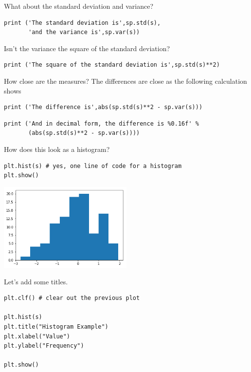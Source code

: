 What about the standard deviation and variance?

\begin{verbatim}
print ('The standard deviation is',sp.std(s),
       'and the variance is',sp.var(s))
\end{verbatim}

Isn't the variance the square of the standard deviation?

\begin{verbatim}
print ('The square of the standard deviation is',sp.std(s)**2)
\end{verbatim}

How close are the measures? The differences are close as the following
calculation shows

\begin{verbatim}
print ('The difference is',abs(sp.std(s)**2 - sp.var(s)))
\end{verbatim}

\begin{verbatim}
print ('And in decimal form, the difference is %0.16f' % 
       (abs(sp.std(s)**2 - sp.var(s))))
\end{verbatim}

How does this look as a histogram?

\begin{verbatim}
plt.hist(s) # yes, one line of code for a histogram
plt.show()
\end{verbatim}

\begin{center}
\includegraphics[width=0.5\textwidth]{scipy/output_23_0.png}
\end{center}

Let's add some titles.

\begin{verbatim}
plt.clf() # clear out the previous plot

plt.hist(s)
plt.title("Histogram Example")
plt.xlabel("Value")
plt.ylabel("Frequency")

plt.show()
\end{verbatim}


